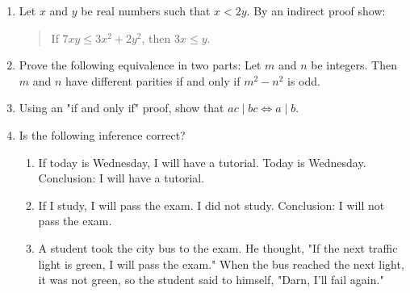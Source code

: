 \documentclass[11pt,paper=b5,footinclude,headinclude]{scrbook} %
\theoremstyle{remark}
\theoremstyle{definition} %
\theoremstyle{theorem} %
\begin{document}
\begin{enumerate}[resume, label=\textbf{Problem \arabic*.}]


\item Let  $x$ and $y$ be real numbers such that $x<2y$. 
By an indirect proof show: 
\begin{quote}
    If $7xy\leq 3x^2 + 2y^2$, then $3x\leq y$.
\end{quote}


    \item Prove the following equivalence in two parts: Let $m$ and $n$ be integers. Then $m$ and $n$ have different parities if and only if $m^2 - n^2$ is odd.



    \item Using an "if and only if" proof, show that $ac \mid bc \Leftrightarrow a \mid b$.

    \item Is the following inference correct?
    \begin{enumerate}[label=(\roman*)]
        \item If today is Wednesday, I will have a tutorial. Today is Wednesday. Conclusion: I will have a tutorial.


        \item If I study, I will pass the exam. I did not study. Conclusion: I will not pass the exam.


        \item A student took the city bus to the exam. He thought, "If the next traffic light is green, I will pass the exam." When the bus reached the next light, it was not green, so the student said to himself, "Darn, I'll fail again."


\end{enumerate}
\end{enumerate}
\end{document}

